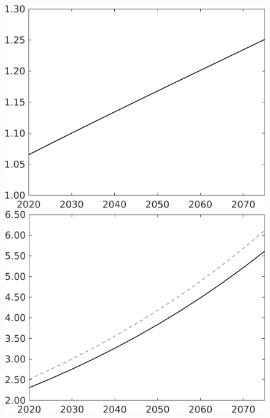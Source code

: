 \documentclass[12pt]{article}
\begin{document}
\begin{figure}[h!!]
\begin{minipage}[]{0.32\textwidth}
	\end{minipage}	
	\begin{minipage}[]{0.32\textwidth}
		\includegraphics[width=1\textwidth]{../../codding_model/own_basedOnFried/optimalPol_010922_revision/figures/all_13Sept22/CompTaul_LFBAU_Reg0_lambdaa_spillover0_nsk1_xgr0_knspil0_sep1_countec0_GovRev0_etaa0.79_lgd0.png}
	\end{minipage}	
	\begin{minipage}[]{0.32\textwidth}
		\includegraphics[width=1\textwidth]{../../codding_model/own_basedOnFried/optimalPol_010922_revision/figures/all_13Sept22/CompTaul_LFBAU_Reg0_Y_spillover0_nsk1_xgr0_knspil0_sep1_countec0_GovRev0_etaa0.79_lgd0.png}

\end{minipage}
\end{figure}
\end{document}
